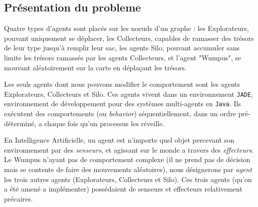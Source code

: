 \documentclass[a4paper, 10pt]{article}
\begin{document}
\subsection{Présentation du probleme}

Quatre types d'agents sont placés sur les noeuds d'un graphe : les Explorateurs, pouvant uniquement se déplacer, les Collecteurs, capables de ramasser des trésors de leur type jusqu'à remplir leur sac, les agents Silo, pouvant accumuler sans limite les trésors ramassés par les agents Collecteurs, et l'agent "Wumpus", se mouvant aléatoirement sur la carte en déplaçant les trésors.

Les seuls agents dont nous pouvons modifier le comportement sont les agents Explorateurs, Collecteurs et Silo. Ces agents vivent dans un environnement \verb|JADE|, environnement de développement pour des systèmes multi-agents en \verb|Java|. Ils exécutent des comportements (ou \textit{behavior}) séquentiellement, dans un ordre pré-déterminé, a chaque fois qu'un processus les réveille.

En Intelligence Artificielle, un agent est n'importe quel objet percevant son environnement par des \textit{senseurs}, et agissant sur le monde a travers des \textit{effecteurs}.  Le Wumpus n'ayant pas de comportement complexe (il ne prend pas de décision mais se contente de faire des mouvements aléatoires), nous désignerons par \textit{agent} les trois autres agents (Explorateurs, Collecteurs et Silo). Ces trois agents (qu'on a été amené a implémenter) possédaient de senseurs et effecteurs relativement précaires.
\end{document}
